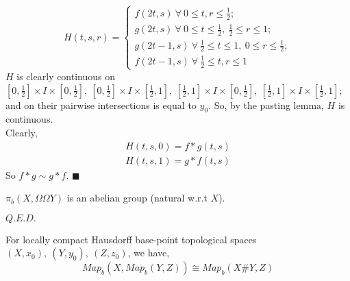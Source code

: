 \documentclass[11pt]{article}
\numberwithin{equation}{section}
\begin{document}
$$H(t,s,r)= \begin{cases}f(2t,s)\ \forall\ 0\leqslant t,r\leqslant\frac{1}{2}; \\ g(2t, s)\ \forall\ 0\leqslant t\leqslant\frac{1}{2},\ \frac{1}{2}\leqslant r\leqslant1;\\ g(2t-1,s)\ \forall\ \frac{1}{2}\leqslant t\leqslant1,\ 0\leqslant r\leqslant\frac{1}{2}; \\ f(2t-1, s)\ \forall\ \frac{1}{2}\leqslant t,r\leqslant1\end{cases}$$
$H$ is clearly continuous on $[0,\frac{1}{2}]\times I\times [0,\frac{1}{2}],\ [0,\frac{1}{2}]\times I\times [\frac{1}{2},1],\ [\frac{1}{2},1]\times I\times [0,\frac{1}{2}],\ [\frac{1}{2},1]\times I\times [\frac{1}{2},1]$; and on their pairwise intersections is equal to $y_0$. So, by the pasting lemma, $H$ is continuous. \\ Clearly,
\begin{align*}
     H(t,s,0)= f*g(t,s)\\ H(t,s,1)=g*f(t,s)
\end{align*}
So $f*g\sim g*f$. $\blacksquare$ 
\begin{cor}
     $\pi_b(X,\Omega\Omega Y)$ is an abelian group (natural w.r.t $X$).
\end{cor}
$Q.E.D.$
\begin{thm}
    For locally compact Hausdorff base-point topological spaces $(X,x_0),\ (Y,y_0),\ (Z,z_0)$, we have, $$Map_b(X,Map_b(Y,Z))\cong Map_b(X\# Y, Z)$$
\end{thm} 
\end{document}
